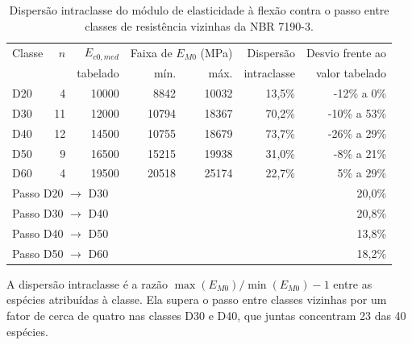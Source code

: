 \begin{table}[!ht]
\caption{Dispersão intraclasse do módulo de elasticidade à flexão contra o passo entre classes de resistência vizinhas da NBR 7190-3.\label{tab:dispersao}}
\begin{threeparttable}
\begin{tabular*}{\columnwidth}{@{\extracolsep{\fill}}lrrrrrr@{\extracolsep{\fill}}}
\toprule
Classe & $n$ & $E_{c0,med}$ & \multicolumn{2}{c}{Faixa de $E_{M0}$ (MPa)} & Dispersão & Desvio frente ao \\
 & & tabelado & mín. & máx. & intraclasse & valor tabelado \\
\midrule
D20 & 4 & 10000 & 8842 & 10032 & 13,5\% & -12\% a 0\% \\
D30 & 11 & 12000 & 10794 & 18367 & 70,2\% & -10\% a 53\% \\
D40 & 12 & 14500 & 10755 & 18679 & 73,7\% & -26\% a 29\% \\
D50 & 9 & 16500 & 15215 & 19938 & 31,0\% & -8\% a 21\% \\
D60 & 4 & 19500 & 20518 & 25174 & 22,7\% & 5\% a 29\% \\
\midrule
\multicolumn{6}{l}{Passo D20 $\rightarrow$ D30} & 20,0\% \\
\multicolumn{6}{l}{Passo D30 $\rightarrow$ D40} & 20,8\% \\
\multicolumn{6}{l}{Passo D40 $\rightarrow$ D50} & 13,8\% \\
\multicolumn{6}{l}{Passo D50 $\rightarrow$ D60} & 18,2\% \\
\bottomrule
\end{tabular*}
\begin{tablenotes}\footnotesize
\item A dispersão intraclasse é a razão $\max(E_{M0})/\min(E_{M0}) - 1$ entre as espécies atribuídas à classe. Ela supera o passo entre classes vizinhas por um fator de cerca de quatro nas classes D30 e D40, que juntas concentram 23 das 40 espécies.
\end{tablenotes}
\end{threeparttable}
\end{table}
